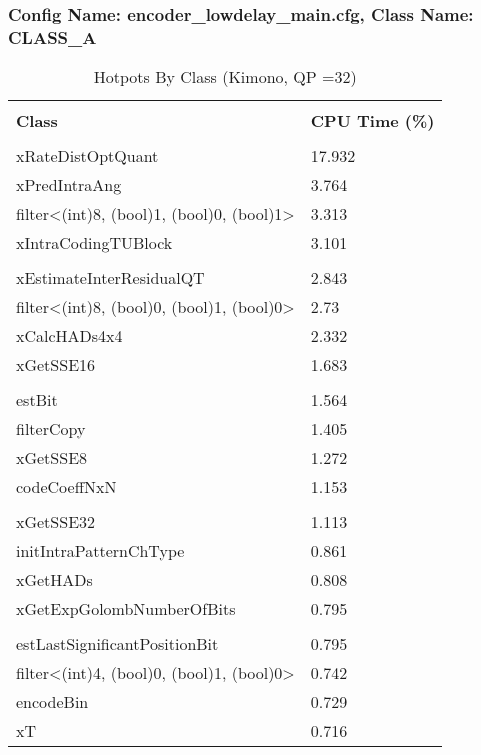 \documentclass{article}%
\begin{document}
\subsubsection{Config Name: encoder\_lowdelay\_main.cfg, Class Name: CLASS\_A}%
\label{ssubsec:ConfigNameencoderlowdelaymain.cfg,ClassNameCLASSA}%
\begin{longtabu}{| X[l] | X[l] |}%
\caption{%
Hotpots By Class (Kimono, QP =32)%
}%
\hline%
&\\%
\textbf{Class}&\textbf{CPU Time (\%)}\\%
&\\%
\hline%
\endhead%
xRateDistOptQuant&17.932\\%
\hline%
xPredIntraAng&3.764\\%
\hline%
filter<(int)8, (bool)1, (bool)0, (bool)1>&3.313\\%
\hline%
xIntraCodingTUBlock&3.101\\%
\hline%
&\\%
\hline%
xEstimateInterResidualQT&2.843\\%
\hline%
filter<(int)8, (bool)0, (bool)1, (bool)0>&2.73\\%
\hline%
xCalcHADs4x4&2.332\\%
\hline%
xGetSSE16&1.683\\%
\hline%
&\\%
\hline%
estBit&1.564\\%
\hline%
filterCopy&1.405\\%
\hline%
xGetSSE8&1.272\\%
\hline%
codeCoeffNxN&1.153\\%
\hline%
&\\%
\hline%
xGetSSE32&1.113\\%
\hline%
initIntraPatternChType&0.861\\%
\hline%
xGetHADs&0.808\\%
\hline%
xGetExpGolombNumberOfBits&0.795\\%
\hline%
&\\%
\hline%
estLastSignificantPositionBit&0.795\\%
\hline%
filter<(int)4, (bool)0, (bool)1, (bool)0>&0.742\\%
\hline%
encodeBin&0.729\\%
\hline%
xT&0.716\\%
\hline%
\end{longtabu}%
\newpage%
\end{document}
